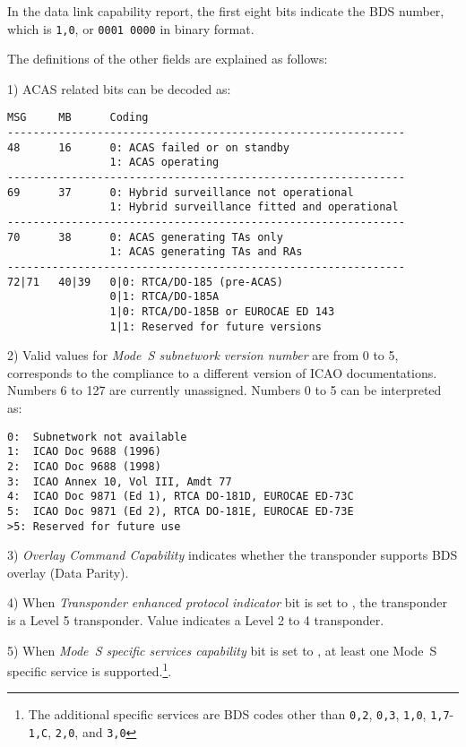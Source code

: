 In the data link capability report, the first eight bits indicate the BDS number, which is \texttt{1,0}, or \texttt{0001 0000} in binary format. 

The definitions of the other fields are explained as follows:

1) ACAS related bits can be decoded as:

\begin{verbatim}
MSG     MB      Coding
--------------------------------------------------------------
48      16      0: ACAS failed or on standby
                1: ACAS operating
--------------------------------------------------------------
69      37      0: Hybrid surveillance not operational
                1: Hybrid surveillance fitted and operational
--------------------------------------------------------------
70      38      0: ACAS generating TAs only
                1: ACAS generating TAs and RAs
--------------------------------------------------------------
72|71   40|39   0|0: RTCA/DO-185 (pre-ACAS)
                0|1: RTCA/DO-185A
                1|0: RTCA/DO-185B or EUROCAE ED 143
                1|1: Reserved for future versions
\end{verbatim}

2) Valid values for \emph{Mode~S subnetwork version number} are from 0 to 5, corresponds to the compliance to a different version of ICAO documentations. Numbers 6 to 127 are currently unassigned. Numbers 0 to 5 can be interpreted as:

\begin{verbatim}
0:  Subnetwork not available
1:  ICAO Doc 9688 (1996)
2:  ICAO Doc 9688 (1998)
3:  ICAO Annex 10, Vol III, Amdt 77
4:  ICAO Doc 9871 (Ed 1), RTCA DO-181D, EUROCAE ED-73C
5:  ICAO Doc 9871 (Ed 2), RTCA DO-181E, EUROCAE ED-73E
>5: Reserved for future use
\end{verbatim}

3) \emph{Overlay Command Capability} indicates whether the transponder supports BDS overlay (Data Parity).

4) When \emph{Transponder enhanced protocol indicator} bit is set to \1, the transponder is a Level 5 transponder. Value \0 indicates a Level 2 to 4 transponder.

5) When \emph{Mode~S specific services capability} bit is set to \1, at least one Mode~S specific service is supported.\footnote{The additional specific services are BDS codes other than \texttt{0,2}, \texttt{0,3}, \texttt{1,0}, \texttt{1,7}-\texttt{1,C}, \texttt{2,0}, and \texttt{3,0}}.

